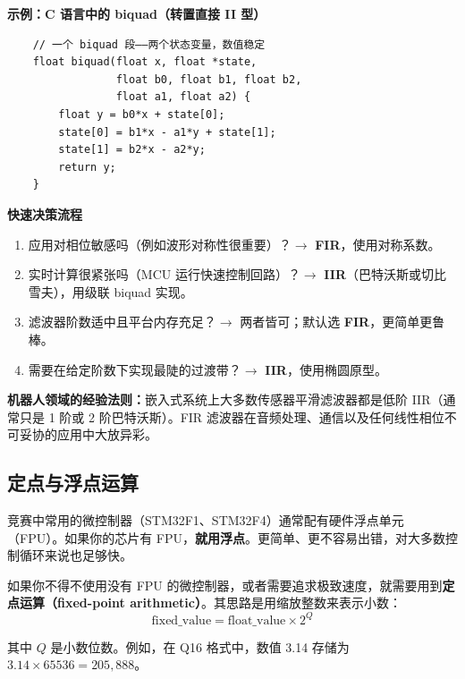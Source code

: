 \textbf{示例：C 语言中的 biquad（转置直接 II 型）}
\begin{verbatim}
    // 一个 biquad 段——两个状态变量，数值稳定
    float biquad(float x, float *state,
                 float b0, float b1, float b2,
                 float a1, float a2) {
        float y = b0*x + state[0];
        state[0] = b1*x - a1*y + state[1];
        state[1] = b2*x - a2*y;
        return y;
    }
\end{verbatim}

\vspace{0.5em}
\begin{mdframed}[linewidth=1pt, innertopmargin=10pt, innerbottommargin=10pt]
\textbf{快速决策流程}

\vspace{0.3em}
\begin{enumerate}[nosep]
    \item 应用对相位敏感吗（例如波形对称性很重要）？$\rightarrow$ \textbf{FIR}，使用对称系数。
    \item 实时计算很紧张吗（MCU 运行快速控制回路）？$\rightarrow$ \textbf{IIR}（巴特沃斯或切比雪夫），用级联 biquad 实现。
    \item 滤波器阶数适中且平台内存充足？$\rightarrow$ 两者皆可；默认选 \textbf{FIR}，更简单更鲁棒。
    \item 需要在给定阶数下实现最陡的过渡带？$\rightarrow$ \textbf{IIR}，使用椭圆原型。
\end{enumerate}

\textbf{机器人领域的经验法则：}嵌入式系统上大多数传感器平滑滤波器都是低阶 IIR（通常只是 1 阶或 2 阶巴特沃斯）。FIR 滤波器在音频处理、通信以及任何线性相位不可妥协的应用中大放异彩。
\end{mdframed}

\subsection{定点与浮点运算}

竞赛中常用的微控制器（STM32F1、STM32F4）通常配有硬件浮点单元（FPU）。如果你的芯片有 FPU，\textbf{就用浮点}。更简单、更不容易出错，对大多数控制循环来说也足够快。

如果你不得不使用没有 FPU 的微控制器，或者需要追求极致速度，就需要用到\textbf{定点运算（fixed-point arithmetic）}。其思路是用缩放整数来表示小数：
\begin{equation}
\text{fixed\_value} = \text{float\_value} \times 2^Q
\end{equation}

其中 $Q$ 是小数位数。例如，在 Q16 格式中，数值 3.14 存储为 $3.14 \times 65536 = 205{,}888$。

